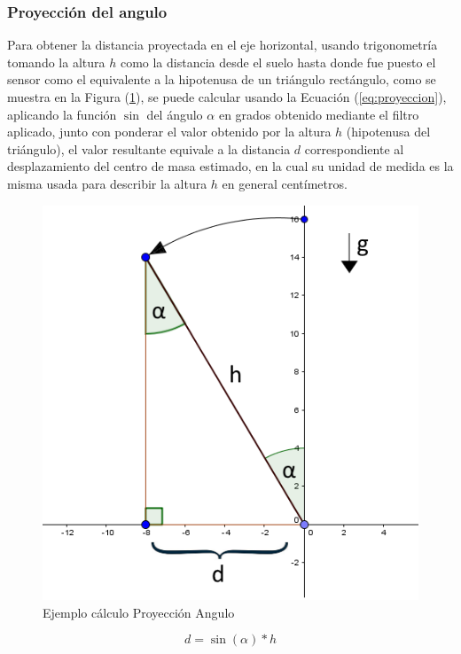\documentclass[12pt,a4paper]{article}
\begin{document}
\subsubsection{Proyección del angulo}
Para obtener la distancia proyectada en el eje horizontal, usando trigonometría tomando la altura $h$ como la distancia desde el suelo hasta donde fue puesto el sensor como el equivalente a la hipotenusa de un triángulo rectángulo, como se muestra en la Figura (\ref{fig:proyeccion}), se puede calcular usando la Ecuación (\ref{eq:proyeccion}), aplicando la función $\sin$ del ángulo $\alpha$ en grados obtenido mediante el filtro aplicado, junto con ponderar el valor obtenido por la altura $h$ (hipotenusa del triángulo), el valor resultante equivale a la distancia $d$ correspondiente al desplazamiento del centro de masa estimado, en la cual su unidad de medida es la misma usada para describir la altura $h$ en general centímetros.

\begin{figure}[H]
	\centering
	\includegraphics[scale=0.6]{images/calculoProyeccion}
	\caption{Ejemplo cálculo Proyección Angulo}
	\label{fig:proyeccion}
\end{figure}

\begin{equation}
	\label{eq:proyeccion}
	d=\sin(\alpha)*h
\end{equation}
\end{document}
